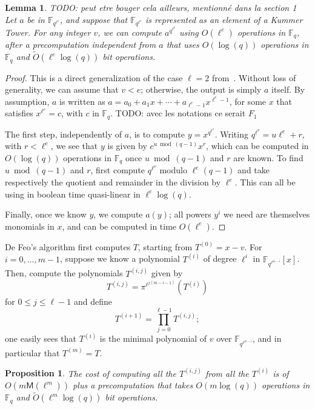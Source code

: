\documentclass{lms}
\newcommand{\todo}[1]{{\color{red}TODO: #1}}
\newtheorem{lem}[thm]{Lemma}
\newtheorem{prop}[thm]{Proposition}
\newcommand{\F}{\mathbb{F}}
\begin{document}
\begin{lem}\label{lemma:frob-ell} \todo{peut etre bouger cela ailleurs, mentionné dans la section 1}
  Let $a$ be in $\F_{q^{\ell^e}}$, and suppose that $\F_{q^{\ell^e}}$
  is represented as an element of a Kummer Tower. For any integer $v$, we can compute
  $a^{q^{\ell^v}}$ using $O(\ell^e)$ operations in $\F_q$, after a
  precomputation independent from $a$ that uses $O(\log(q))$
  operations in $\F_q$ and $\tilde{O}(\ell^e \log(q))$ bit operations.
\end{lem}
\begin{proof}
  This is a direct generalization of the case $\ell=2$ from~\cite{DoSc12}.
  Without loss of generality, we can assume that $v < e$; otherwise,
  the output is simply $a$ itself. By assumption, $a$ is written as
  $a =a_0 + a_1 x + \cdots + a_{\ell^e-1} x^{\ell^e-1}$, for some $x$
  that satisfies $x^{\ell^e}=c$, with $c$ in $\F_q$. \todo{avec les notations ce serait $F_1$} 

  The first step, independently of $a$, is to compute
  $y=x^{q^{\ell^v}}$. Writing $q^{\ell^v} = u \ell^e + r$, with $r <
  \ell^e$, we see that $y$ is given by $c^{u \bmod (q-1)}x^r$, which
  can be computed in $O(\log(q))$ operations in $\F_q$ once $u \bmod
  (q-1)$ and $r$ are known.  To find $u \bmod (q-1)$ and $r$, first
  compute $q^{\ell^v}$ modulo $\ell^e(q-1)$ and take respectively the
  quotient and remainder in the division by $\ell^e$. This can all be
  using in boolean time quasi-linear in $\ell^e \log(q)$.

  Finally, once we know $y$, we compute $a(y)$; all powers $y^i$ we need
  are themselves monomials in $x$, and can be computed in time $O(\ell^e)$.
\end{proof}

De Feo's algorithm first computes $T$, starting from $T^{(0)}=x-v$.
For $i=0,\dots,m-1$, suppose we know a polynomial $T^{(i)}$ of degree
$\ell^i$ in $\F_{q^{\ell^{m-i}}}[x]$. Then, compute the polynomials
$T^{(i,j)}$ given by
$$T^{(i,j)}= \pi^{\ell^{j(m-i-1)}}\left (T^{(i)} \right)$$
for $0 \le j \le \ell-1$
and define 
$$T^{(i+1)}=\prod_{j=0}^{\ell-1} T^{(i,j)};$$ one easily sees that
$T^{(i)}$ is the minimal polynomial of $v$ over $\F_{q^{\ell^{m-i}}}$,
and in particular that $T^{(m)}=T$.  

\begin{prop}
The cost of computing all the $T^{(i,j)}$ from all the $T^{(i)}$ is of $O(m\mathsf{M}(\ell^m))$ plus a
precomputation that takes $O(m \log(q))$ operations in $\F_q$ and
$\tilde{O}(\ell^{m} \log(q))$ bit operations.
\end{prop}
\end{document}
